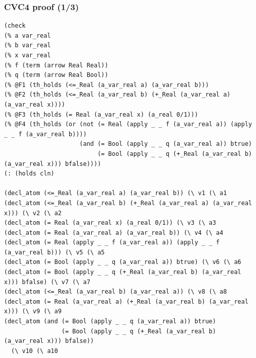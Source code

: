 \documentclass[svgnames,table,mathserif]{beamer}
\begin{document}
\begin{frame}[fragile]
\frametitle{CVC4 proof (1/3)}

{\tiny
\begin{verbatim}
(check
(% a var_real
(% b var_real
(% x var_real
(% f (term (arrow Real Real))
(% q (term (arrow Real Bool))
(% @F1 (th_holds (<=_Real (a_var_real a) (a_var_real b)))
(% @F2 (th_holds (<=_Real (a_var_real b) (+_Real (a_var_real a) (a_var_real x))))
(% @F3 (th_holds (= Real (a_var_real x) (a_real 0/1)))
(% @F4 (th_holds (or (not (= Real (apply _ _ f (a_var_real a)) (apply _ _ f (a_var_real b)))) 
                     (and (= Bool (apply _ _ q (a_var_real a)) btrue)
                          (= Bool (apply _ _ q (+_Real (a_var_real b) (a_var_real x))) bfalse))))
(: (holds cln)

(decl_atom (<=_Real (a_var_real a) (a_var_real b)) (\ v1 (\ a1
(decl_atom (<=_Real (a_var_real b) (+_Real (a_var_real a) (a_var_real x))) (\ v2 (\ a2
(decl_atom (= Real (a_var_real x) (a_real 0/1)) (\ v3 (\ a3
(decl_atom (= Real (a_var_real a) (a_var_real b)) (\ v4 (\ a4
(decl_atom (= Real (apply _ _ f (a_var_real a)) (apply _ _ f (a_var_real b))) (\ v5 (\ a5
(decl_atom (= Bool (apply _ _ q (a_var_real a)) btrue) (\ v6 (\ a6
(decl_atom (= Bool (apply _ _ q (+_Real (a_var_real b) (a_var_real x))) bfalse) (\ v7 (\ a7
(decl_atom (<=_Real (a_var_real b) (a_var_real a)) (\ v8 (\ a8
(decl_atom (= Real (a_var_real a) (+_Real (a_var_real b) (a_var_real x))) (\ v9 (\ a9
(decl_atom (and (= Bool (apply _ _ q (a_var_real a)) btrue)
                (= Bool (apply _ _ q (+_Real (a_var_real b) (a_var_real x))) bfalse))
  (\ v10 (\ a10
\end{verbatim}
}
\end{frame}
\end{document}
